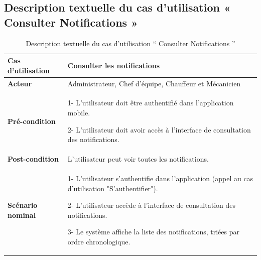 \newpage

\subsection{Description textuelle du cas d’utilisation « Consulter Notifications »}

\begin{table}[htbp]
    \centering
    \renewcommand{\arraystretch}{1.5}
    \begin{tabular}{|p{4cm}|p{9.5cm}|}
        \hline
        \textbf{Cas d'utilisation} & Consulter les notifications                                                                              \\
        \hline
        \textbf{Acteur}            & Administrateur, Chef d’équipe, Chauffeur et Mécanicien                                                   \\
        \hline
        \textbf{Pré-condition}     & 1- L'utilisateur doit être authentifié dans l'application mobile.\newline

        2- L'utilisateur doit avoir accès à l'interface de consultation des notifications.                                                    \\


        \hline
        \textbf{Post-condition}    & L'utilisateur peut voir toutes les notifications.                                                        \\
        \hline
        \textbf{Scénario nominal}  & 1- L'utilisateur s'authentifie dans l'application (appel au cas d'utilisation "S'authentifier").\newline

        2- L'utilisateur accède à l'interface de consultation des notifications.\newline

        3- Le système affiche la liste des notifications, triées par ordre chronologique.                                                     \\

        \hline
    \end{tabular}
    \caption{Description textuelle du cas d’utilisation “ Consulter Notifications ”}

\end{table}


